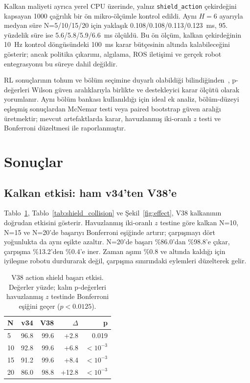 \documentclass[conference]{IEEEtran}
\begin{document}
Kalkan maliyeti ayrıca yerel CPU üzerinde, yalnız \texttt{shield\_action} çekirdeğini kapsayan 1000 çağrılık bir
ön mikro-ölçümle kontrol edildi. Aynı $H=6$ ayarıyla medyan süre N=5/10/15/20 için yaklaşık
0.108/0.108/0.113/0.123~ms, 95. yüzdelik süre ise 5.6/5.8/5.9/6.6~ms ölçüldü. Bu ön ölçüm, kalkan çekirdeğinin
10~Hz kontrol döngüsündeki 100~ms karar bütçesinin altında kalabileceğini gösterir; ancak politika çıkarımı,
algılama, ROS iletişimi ve gerçek robot entegrasyonu bu süreye dahil değildir.

RL sonuçlarının tohum ve bölüm seçimine duyarlı olabildiği bilindiğinden~\cite{henderson2018matters,agarwal2021precipice},
p-değerleri Wilson güven aralıklarıyla birlikte ve destekleyici karar ölçütü olarak yorumlanır. Aynı bölüm
bankası kullanıldığı için ideal ek analiz, bölüm-düzeyi eşleşmiş sonuçlardan McNemar testi veya paired bootstrap
güven aralığı üretmektir; mevcut artefaktlarda karar, havuzlanmış iki-oranlı $z$ testi ve Bonferroni düzeltmesi
ile raporlanmıştır.

\section{Sonuçlar}
\subsection{Kalkan etkisi: ham v34'ten V38'e}
Tablo~\ref{tab:shield_success}, Tablo~\ref{tab:shield_collision} ve Şekil~\ref{fig:effect}, V38 kalkanının
doğrudan etkisini gösterir. Havuzlanmış iki-oranlı $z$ testine göre kalkan N=10, N=15 ve N=20'de başarıyı
Bonferroni eşiğinde artırır; çarpışmayı dört yoğunlukta da aynı eşikte azaltır.
N=20'de başarı \%86.0'dan \%98.8'e çıkar, çarpışma \%13.2'den \%0.4'e iner. Zaman aşımı \%0.8 ve altında
kaldığı için iyileşme robotu durdurarak değil, çarpışma sınırındaki eylemleri düzelterek gelir.

\begin{table}[H]
\centering
\caption{V38 action shield başarı etkisi. Değerler yüzde; kalın p-değerleri havuzlanmış $z$ testinde
Bonferroni eşiğini geçer ($p<0.0125$).}
\label{tab:shield_success}
\small
\begin{tabular}{@{}lrrrr@{}}
\toprule
\textbf{N} & \textbf{v34} & \textbf{V38} & \textbf{$\Delta$} & \textbf{p} \\
\midrule
5  & 96.8 & 99.6 & +2.8  & 0.019 \\
10 & 92.8 & 99.6 & +6.8  & \textbf{$<10^{-3}$} \\
15 & 91.2 & 99.6 & +8.4  & \textbf{$<10^{-3}$} \\
20 & 86.0 & 98.8 & +12.8 & \textbf{$<10^{-3}$} \\
\bottomrule
\end{tabular}
\end{table}
\end{document}
